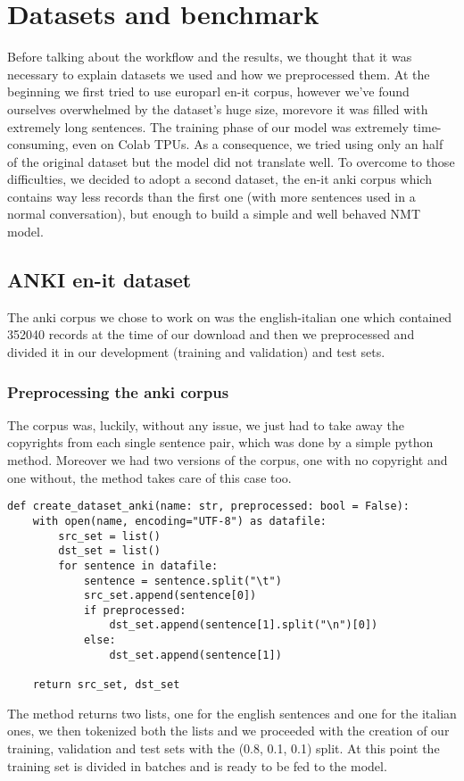 \section{Datasets and benchmark}\label{sec:dataset}
Before talking about the workflow and the results, we thought that it was necessary to explain datasets we used and how we preprocessed them. At the beginning we first tried to use  europarl en-it corpus, however we've found ourselves overwhelmed by the dataset's huge size, morevore it was filled with extremely long sentences. The training phase of our model was extremely time-consuming, even on Colab TPUs. As a consequence, we tried using only an half of the original dataset but the model did not translate well. To overcome to those difficulties,  we decided to adopt a second dataset, the en-it anki corpus which contains way less records than the first one (with more sentences used in a normal conversation), but enough to build a simple and well behaved NMT model.
\subsection{ANKI en-it dataset}
The anki corpus\cite{anki_dataset} we chose to work on was the english-italian one which contained 352040 records at the time of our download and then we preprocessed and divided it in our development (training and validation) and test sets.
\subsubsection{Preprocessing the anki corpus}
The corpus was, luckily, without any issue, we just had to take away the copyrights from each single sentence pair, which was done by a simple python method. Moreover we had two versions of the corpus, one with no copyright and one without, the method takes care of this case too.
\begin{verbatim}
def create_dataset_anki(name: str, preprocessed: bool = False):
    with open(name, encoding="UTF-8") as datafile:
        src_set = list()
        dst_set = list()
        for sentence in datafile:
            sentence = sentence.split("\t")
            src_set.append(sentence[0])
            if preprocessed:
                dst_set.append(sentence[1].split("\n")[0])
            else:
                dst_set.append(sentence[1])

    return src_set, dst_set
\end{verbatim}
The method returns two lists, one for the english sentences and one for the italian ones, we then tokenized both the lists and we proceeded with the creation of our training, validation and test sets with the (0.8, 0.1, 0.1) split.
At this point the training set is divided in batches and is ready to be fed to the model.

